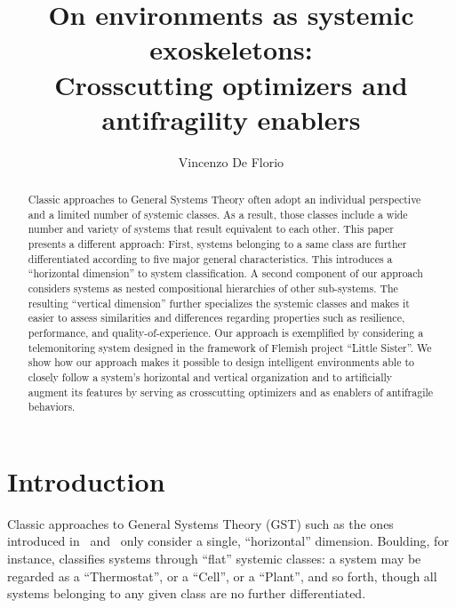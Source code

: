 \documentclass[twocolumn]{svjour3}
\begin{document}
\title{On environments as systemic exoskeletons: \\Crosscutting optimizers and antifragility enablers}
\author{Vincenzo De Florio}
 \date{} \maketitle 

\begin{abstract}
Classic approaches to General Systems Theory often adopt an individual perspective and a limited 
number of systemic classes. As a result, those classes include a wide number and variety of systems that 
result equivalent to each other. This paper presents a different approach: First, systems belonging to a same 
class are further differentiated according to five major general characteristics. This introduces a ``horizontal 
dimension'' to system classification. A second component of our approach considers systems as nested 
compositional hierarchies of other sub-systems. The resulting ``vertical dimension'' further specializes the 
systemic classes and makes it easier to assess similarities and differences regarding properties such as 
resilience, performance, and quality-of-experience.
Our approach is exemplified by considering a telemonitoring system designed in the framework of Flemish project
``Little Sister''. 
We show how our approach makes it possible to design intelligent environments able to closely follow a system's 
horizontal and vertical organization and to artificially augment its features by serving as crosscutting 
optimizers  and as enablers of antifragile behaviors.
\end{abstract}



\section{Introduction}\label{s:intro}


Classic approaches to General Systems Theory (GST) such as the ones introduced in~\cite{RWB43} and~\cite{Bou56}
only consider a single, ``horizontal'' dimension. Boulding, for instance, classifies
systems through ``flat'' systemic classes: a system may be regarded as a ``Thermostat'', or
a ``Cell'', or a ``Plant'', and so forth, though all systems belonging to any given class
are no further differentiated. 
\end{document}
